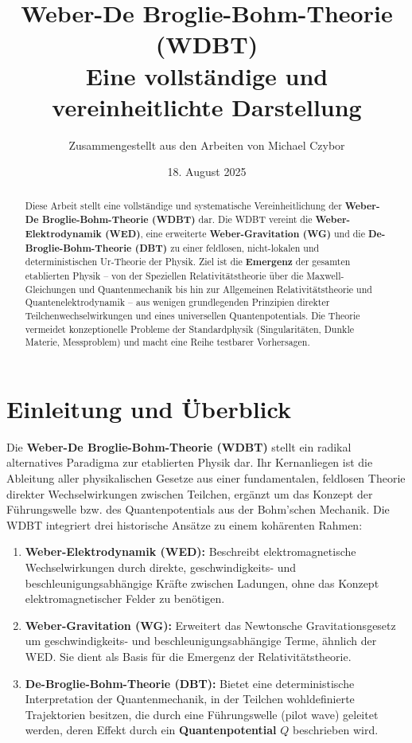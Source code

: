 \documentclass[11pt, a4paper]{article}
\title{Weber-De Broglie-Bohm-Theorie (WDBT) \\ Eine vollständige und vereinheitlichte Darstellung}
\author{Zusammengestellt aus den Arbeiten von Michael Czybor}
\date{18. August 2025}
\begin{document}
\maketitle

\begin{abstract}
Diese Arbeit stellt eine vollständige und systematische Vereinheitlichung der \textbf{Weber-De Broglie-Bohm-Theorie (WDBT)} dar. Die WDBT vereint die \textbf{Weber-Elektrodynamik (WED)}, eine erweiterte \textbf{Weber-Gravitation (WG)} und die \textbf{De-Broglie-Bohm-Theorie (DBT)} zu einer feldlosen, nicht-lokalen und deterministischen Ur-Theorie der Physik. Ziel ist die \textbf{Emergenz} der gesamten etablierten Physik – von der Speziellen Relativitätstheorie über die Maxwell-Gleichungen und Quantenmechanik bis hin zur Allgemeinen Relativitätstheorie und Quantenelektrodynamik – aus wenigen grundlegenden Prinzipien direkter Teilchenwechselwirkungen und eines universellen Quantenpotentials. Die Theorie vermeidet konzeptionelle Probleme der Standardphysik (Singularitäten, Dunkle Materie, Messproblem) und macht eine Reihe testbarer Vorhersagen.
\end{abstract}

\tableofcontents

\section{Einleitung und Überblick}
\label{sec:einleitung}

Die \textbf{Weber-De Broglie-Bohm-Theorie (WDBT)} stellt ein radikal alternatives Paradigma zur etablierten Physik dar. Ihr Kernanliegen ist die Ableitung aller physikalischen Gesetze aus einer fundamentalen, feldlosen Theorie direkter Wechselwirkungen zwischen Teilchen, ergänzt um das Konzept der Führungswelle bzw. des Quantenpotentials aus der Bohm'schen Mechanik. Die WDBT integriert drei historische Ansätze zu einem kohärenten Rahmen:

\begin{enumerate}
    \item \textbf{Weber-Elektrodynamik (WED):} Beschreibt elektromagnetische Wechselwirkungen durch direkte, geschwindigkeits- und beschleunigungsabhängige Kräfte zwischen Ladungen, ohne das Konzept elektromagnetischer Felder zu benötigen.
    \item \textbf{Weber-Gravitation (WG):} Erweitert das Newtonsche Gravitationsgesetz um geschwindigkeits- und beschleunigungsabhängige Terme, ähnlich der WED. Sie dient als Basis für die Emergenz der Relativitätstheorie.
    \item \textbf{De-Broglie-Bohm-Theorie (DBT):} Bietet eine deterministische Interpretation der Quantenmechanik, in der Teilchen wohldefinierte Trajektorien besitzen, die durch eine Führungswelle (\glqq pilot wave\grqq) geleitet werden, deren Effekt durch ein \textbf{Quantenpotential} $Q$ beschrieben wird.
\end{enumerate}
\end{document}
